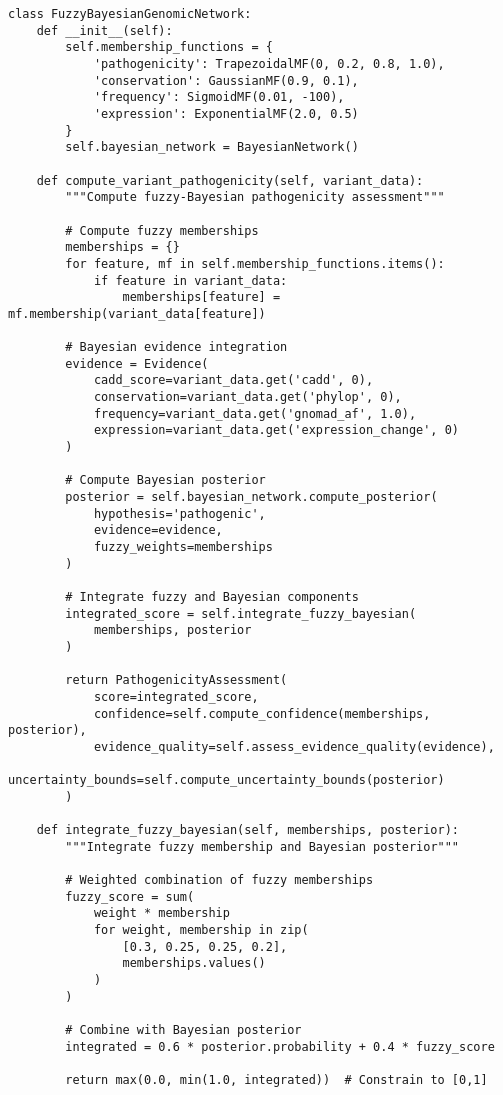 \documentclass[12pt,a4paper]{article}
\begin{document}
\begin{lstlisting}[style=pythonstyle, caption=Fuzzy-Bayesian Network Implementation]
class FuzzyBayesianGenomicNetwork:
    def __init__(self):
        self.membership_functions = {
            'pathogenicity': TrapezoidalMF(0, 0.2, 0.8, 1.0),
            'conservation': GaussianMF(0.9, 0.1),
            'frequency': SigmoidMF(0.01, -100),
            'expression': ExponentialMF(2.0, 0.5)
        }
        self.bayesian_network = BayesianNetwork()
        
    def compute_variant_pathogenicity(self, variant_data):
        """Compute fuzzy-Bayesian pathogenicity assessment"""
        
        # Compute fuzzy memberships
        memberships = {}
        for feature, mf in self.membership_functions.items():
            if feature in variant_data:
                memberships[feature] = mf.membership(variant_data[feature])
        
        # Bayesian evidence integration
        evidence = Evidence(
            cadd_score=variant_data.get('cadd', 0),
            conservation=variant_data.get('phylop', 0),
            frequency=variant_data.get('gnomad_af', 1.0),
            expression=variant_data.get('expression_change', 0)
        )
        
        # Compute Bayesian posterior
        posterior = self.bayesian_network.compute_posterior(
            hypothesis='pathogenic',
            evidence=evidence,
            fuzzy_weights=memberships
        )
        
        # Integrate fuzzy and Bayesian components
        integrated_score = self.integrate_fuzzy_bayesian(
            memberships, posterior
        )
        
        return PathogenicityAssessment(
            score=integrated_score,
            confidence=self.compute_confidence(memberships, posterior),
            evidence_quality=self.assess_evidence_quality(evidence),
            uncertainty_bounds=self.compute_uncertainty_bounds(posterior)
        )
        
    def integrate_fuzzy_bayesian(self, memberships, posterior):
        """Integrate fuzzy membership and Bayesian posterior"""
        
        # Weighted combination of fuzzy memberships
        fuzzy_score = sum(
            weight * membership 
            for weight, membership in zip(
                [0.3, 0.25, 0.25, 0.2], 
                memberships.values()
            )
        )
        
        # Combine with Bayesian posterior
        integrated = 0.6 * posterior.probability + 0.4 * fuzzy_score
        
        return max(0.0, min(1.0, integrated))  # Constrain to [0,1]
\end{lstlisting}
\end{document}

